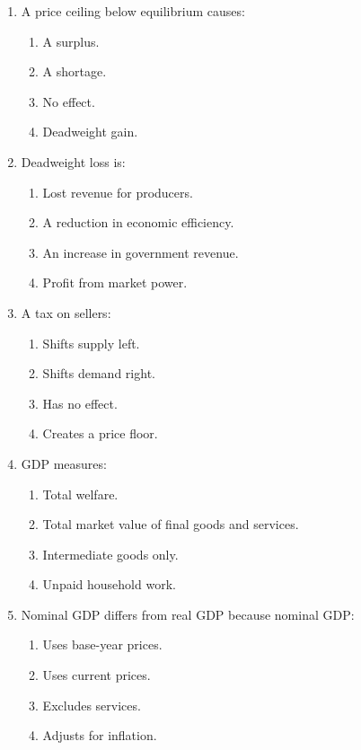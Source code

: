 \documentclass[12pt]{article}
\begin{document}
\begin{enumerate}[label=\textbf{\arabic*.}]
\item A price ceiling below equilibrium causes:
\begin{enumerate}[label=(\Alph*)]
    \item A surplus.
    \item A shortage.
    \item No effect.
    \item Deadweight gain.
\end{enumerate}
\newpage
\item Deadweight loss is:
\begin{enumerate}[label=(\Alph*)]
    \item Lost revenue for producers.
    \item A reduction in economic efficiency.
    \item An increase in government revenue.
    \item Profit from market power.
\end{enumerate}

\item A tax on sellers:
\begin{enumerate}[label=(\Alph*)]
    \item Shifts supply left.
    \item Shifts demand right.
    \item Has no effect.
    \item Creates a price floor.
\end{enumerate}

\item GDP measures:
\begin{enumerate}[label=(\Alph*)]
    \item Total welfare.
    \item Total market value of final goods and services.
    \item Intermediate goods only.
    \item Unpaid household work.
\end{enumerate}

\item Nominal GDP differs from real GDP because nominal GDP:
\begin{enumerate}[label=(\Alph*)]
    \item Uses base-year prices.
    \item Uses current prices.
    \item Excludes services.
    \item Adjusts for inflation.
\end{enumerate}


\end{enumerate}
\end{document}
